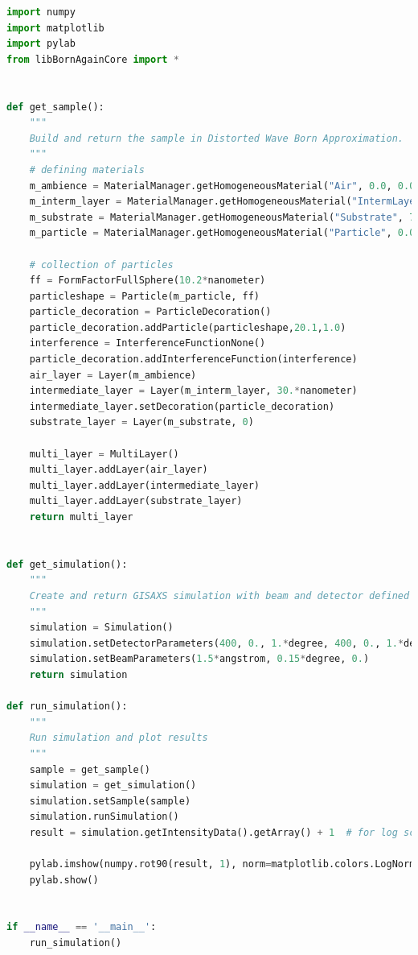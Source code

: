 \begin{lstlisting}[language=python, style=eclipseboxed,numbers=none,nolol,caption={\Code{Python} script to generate fig.\ref{fig:dwbaburied}. Spherical particles are embedded in the middle of a layer on a substrate.},label={lst:dwbaburied}]
import numpy
import matplotlib
import pylab
from libBornAgainCore import *


def get_sample():
    """
    Build and return the sample in Distorted Wave Born Approximation.
    """
    # defining materials
    m_ambience = MaterialManager.getHomogeneousMaterial("Air", 0.0, 0.0)
    m_interm_layer = MaterialManager.getHomogeneousMaterial("IntermLayer",3.45e-6, 5.24e-9)
    m_substrate = MaterialManager.getHomogeneousMaterial("Substrate", 7.43e-6, 1.72e-7)
    m_particle = MaterialManager.getHomogeneousMaterial("Particle", 0.0, 0.0)

    # collection of particles 
    ff = FormFactorFullSphere(10.2*nanometer)
    particleshape = Particle(m_particle, ff)
    particle_decoration = ParticleDecoration()
    particle_decoration.addParticle(particleshape,20.1,1.0)
    interference = InterferenceFunctionNone()
    particle_decoration.addInterferenceFunction(interference)
    air_layer = Layer(m_ambience)
    intermediate_layer = Layer(m_interm_layer, 30.*nanometer)
    intermediate_layer.setDecoration(particle_decoration)
    substrate_layer = Layer(m_substrate, 0)
   
    multi_layer = MultiLayer()
    multi_layer.addLayer(air_layer)
    multi_layer.addLayer(intermediate_layer)
    multi_layer.addLayer(substrate_layer)
    return multi_layer


def get_simulation():
    """
    Create and return GISAXS simulation with beam and detector defined
    """
    simulation = Simulation()
    simulation.setDetectorParameters(400, 0., 1.*degree, 400, 0., 1.*degree, True)
    simulation.setBeamParameters(1.5*angstrom, 0.15*degree, 0.)
    return simulation

def run_simulation():
    """
    Run simulation and plot results
    """
    sample = get_sample()
    simulation = get_simulation()
    simulation.setSample(sample)
    simulation.runSimulation()
    result = simulation.getIntensityData().getArray() + 1  # for log scale

    pylab.imshow(numpy.rot90(result, 1), norm=matplotlib.colors.LogNorm(), extent=[0.0, 1.0, 0, 1.0])
    pylab.show()

   
if __name__ == '__main__':
    run_simulation()
\end{lstlisting}



